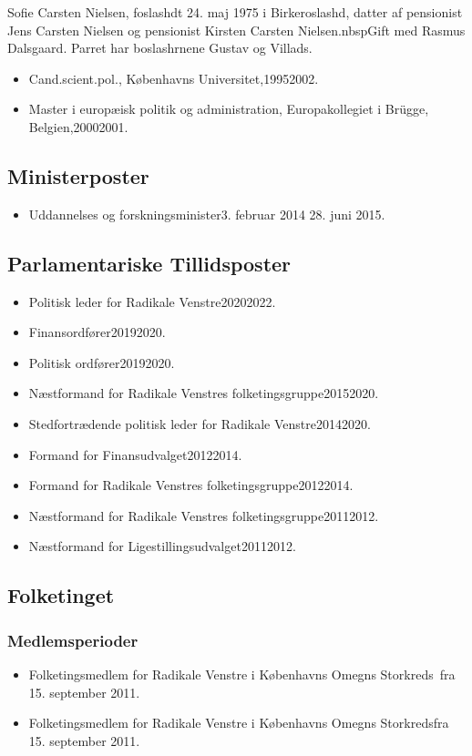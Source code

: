 \documentclass[11pt, a4paper]{awesome-cv}
\begin{document}
\makecvheader[R]
\makelettertitle
\begin{cvletter}
Sofie Carsten Nielsen, foslashdt 24. maj 1975 i Birkeroslashd, datter af pensionist Jens Carsten Nielsen og pensionist Kirsten Carsten Nielsen.nbspGift med Rasmus Dalsgaard. Parret har boslashrnene Gustav og Villads.

\begin{itemize}
\item Cand.scient.pol., Københavns Universitet,19952002.
\item Master i europæisk politik og administration, Europakollegiet i Brügge, Belgien,20002001.
\end{itemize}
\subsection*{Ministerposter}
\begin{itemize}
\item Uddannelses og forskningsminister3. februar 2014  28. juni 2015.
\end{itemize}
\subsection*{Parlamentariske Tillidsposter}
\begin{itemize}
\item Politisk leder for Radikale Venstre20202022.
\item Finansordfører20192020.
\item Politisk ordfører20192020.
\item Næstformand for Radikale Venstres folketingsgruppe20152020.
\item Stedfortrædende politisk leder for Radikale Venstre20142020.
\item Formand for Finansudvalget20122014.
\item Formand for Radikale Venstres folketingsgruppe20122014.
\item Næstformand for Radikale Venstres folketingsgruppe20112012.
\item Næstformand for Ligestillingsudvalget20112012.
\end{itemize}
\subsection*{Folketinget}
\subsubsection*{Medlemsperioder}
\begin{itemize}
\item Folketingsmedlem for Radikale Venstre i Københavns Omegns Storkreds fra 15. september 2011.
\item Folketingsmedlem for Radikale Venstre i Københavns Omegns Storkredsfra 15. september 2011.
\end{itemize}

\end{cvletter}
\end{document}
